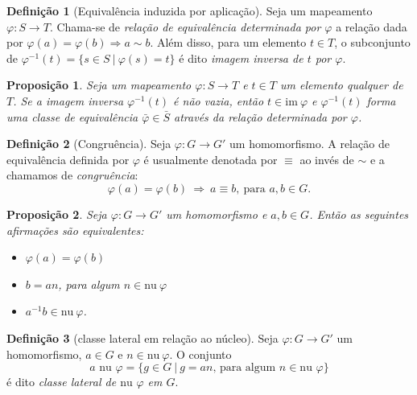 \documentclass[a4paper,12pt]{report}
\theoremstyle{plain}
\newtheorem{proposicao}{Proposição}[section]
\theoremstyle{definition}
\newtheorem{definicao}{Definição}[section]
\begin{document}
	\begin{definicao}[Equivalência induzida por aplicação]
		Seja um mapeamento \(\varphi: S \longrightarrow T\).
		Chama-se de \emph{relação de equivalência determinada por \(\varphi\)} a
		relação dada por \(\varphi(a) = \varphi(b) \Rightarrow a \sim b\). Além
		disso, para um elemento \(t\in T\), o subconjunto de
		\(\varphi^{-1}(t) = \{s \in S\ | \ \varphi(s) = t\}\) é dito
		\emph{imagem inversa de \(t\) por \(\varphi\)}.
	\end{definicao}
	
	\begin{proposicao}
		Seja um mapeamento \(\varphi: S \longrightarrow T\)
		e \(t \in T\) um elemento qualquer de \(T\). Se a imagem inversa
		\(\varphi^{-1}(t)\) é não vazia, então \(t \in \text{im}\ \varphi\) e
		\(\varphi^{-1}(t)\) forma uma classe de equivalência
		\(\bar{\varphi}\in \bar{S}\) através da relação determinada por
		\(\varphi\).	
	\end{proposicao}
	
	\begin{definicao}[Congruência]
		Seja \(\varphi: G\longrightarrow G'\) um
		homomorfismo. A relação de equivalência definida por \(\varphi\) é
		usualmente denotada por \(\equiv\) ao invés de \(\sim\) e a chamamos de
		\emph{congruência}:
		\[\varphi(a) = \varphi(b) \ \Rightarrow \ a \equiv b, \ \text{para }a,b \in G.\]	
	\end{definicao}
	
	\begin{proposicao}
		Seja \(\varphi: G\longrightarrow G'\) um
		homomorfismo e \(a,b \in G\). Então as seguintes afirmações são
		equivalentes:
		\begin{itemize}
			\item
			\(\varphi(a) = \varphi(b)\)
			\item
			\(b = an\), para algum \(n\in \text{nu} \ \varphi\)
			\item
			\(a^{-1}b \in \text{nu} \ \varphi\).
		\end{itemize}	
	\end{proposicao}
	
	\begin{definicao}[classe lateral em relação ao núcleo]
		Seja \(\varphi: G\longrightarrow G'\) um
		homomorfismo, \(a \in G\) e \(n\in\text{nu}\ \varphi\). O conjunto
		\[a\text{ nu }\varphi = \{g\in G \ | \ g = an \text{, para algum } n\in\text{nu }\varphi\}\] é dito \emph{classe lateral de \(\text{nu }\varphi\) em \(G\)}.	
	\end{definicao}
	
\end{document}
